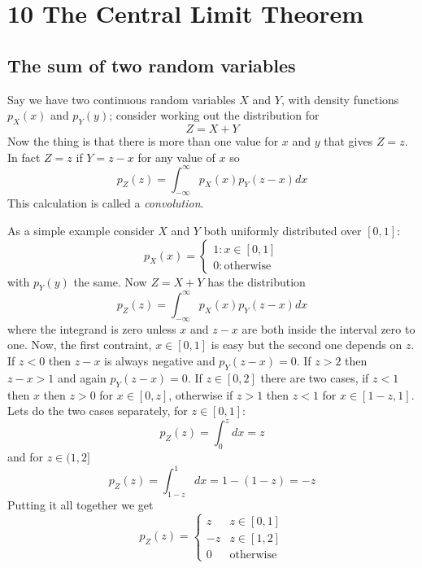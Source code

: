\documentclass[11pt,a4paper]{scrartcl}
\begin{document}
\section*{10 The Central Limit Theorem}

\subsection*{The sum of two random variables}

Say we have two continuous random variables $X$ and $Y$, with density
functions $p_X(x)$ and $p_Y(y)$; consider working out the distribution for 
\begin{equation}
Z=X+Y
\end{equation}
Now the thing is that there is more than one value for $x$ and $y$
that gives $Z=z$. In fact $Z=z$ if $Y=z-x$ for any value of $x$ so
\begin{equation}
p_Z(z)=\int_{-\infty}^\infty {p_X(x)p_Y(z-x)dx}
\end{equation}
This calculation is called a \textsl{convolution}.

As a simple example consider $X$ and $Y$ both uniformly distributed
over $[0,1]$:
\begin{equation}
p_X(x)=\left\{\begin{array}{ll}1:x\in[0,1]\\0:\mbox{otherwise}\end{array}\right.
\end{equation}
with $p_Y(y)$ the same. Now $Z=X+Y$ has the distribution
\begin{equation}
p_Z(z)=\int_{-\infty}^\infty {p_X(x)p_Y(z-x)dx}
\end{equation}
where the integrand is zero unless $x$ and $z-x$ are both inside the
interval zero to one. Now, the first contraint, $x\in [0,1]$ is easy
but the second one depends on $z$. If $z<0$ then $z-x$ is always
negative and $p_Y(z-x)=0$. If $z>2$ then $z-x>1$ and again
$p_Y(z-x)=0$. If $z\in [0,2]$ there are two cases, if $z<1$ then $x$
then $z>0$ for $x\in [0,z]$, otherwise if $z>1$ then $z<1$ for
$x\in [1-z,1]$. Lets do the two cases separately, for $z\in [0,1]$:
\begin{equation}
p_Z(z)=\int_0^z dx=z
\end{equation}
and for $z\in (1,2]$
\begin{equation}
p_Z(z)=\int_{1-z}^1dx=1-(1-z)=-z
\end{equation}
Putting it all together we get
\begin{equation}
p_Z(z)=\left\{\begin{array}{ll} z&z\in [0,1]\\-z& z\in [1,2]\\0&\mbox{otherwise}\end{array}\right.
\end{equation}
\end{document}
